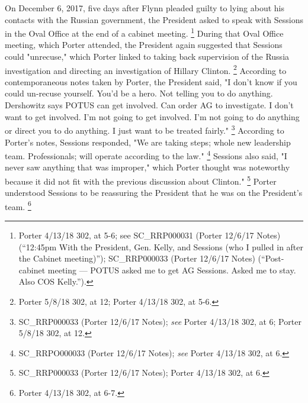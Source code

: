 {On December 6, 2017, five days after Flynn pleaded guilty to lying about his contacts with the Russian government, the President asked to speak with Sessions in the Oval Office at the end of a cabinet meeting.%
\footnote{Porter 4/13/18 302, at 5-6;
see SC\_RRP000031 (Porter 12/6/17 Notes) (“12:45pm With the President, Gen. Kelly, and Sessions (who I pulled in after the Cabinet meeting)”);
SC\_RRP000033 (Porter 12/6/17 Notes) (“Post-cabinet meeting — POTUS asked me to get AG Sessions.
Asked me to stay.
Also COS Kelly.”).}
During that Oval Office meeting, which Porter attended, the President again suggested that Sessions could "unrecuse," which Porter linked to taking back supervision of the Russia investigation and directing an investigation of Hillary Clinton.%
\footnote{Porter 5/8/18 302, at 12;
Porter 4/13/18 302, at 5-6.}
According to contemporaneous notes taken by Porter, the President said, "I don't know if you could un-recuse yourself.
You'd be a hero.
Not telling you to do anything.
Dershowitz says POTUS can get involved.
Can order AG to investigate.
I don't want to get involved.
I'm not going to get involved.
I'm not going to do anything or direct you to do anything.
I just want to be treated fairly."%
\footnote{SC\_RRP000033 (Porter 12/6/17 Notes);
\textit{see} Porter 4/13/18 302, at 6;
Porter 5/8/18 302, at 12.}
According to Porter's notes, Sessions responded, "We are taking steps; whole new leadership team.
Professionals; will operate according to the law."%
\footnote{SC\_RRPO000033 (Porter 12/6/17 Notes);
\textit{see} Porter 4/13/18 302, at 6.}
Sessions also said, "I never saw anything that was improper," which Porter thought was noteworthy because it did not fit with the previous discussion about Clinton."%
\footnote{SC\_RRP000033 (Porter 12/6/17 Notes);
Porter 4/13/18 302, at 6.}
Porter understood Sessions to be reassuring the President that he was on the President's team.%
\footnote{Porter 4/13/18 302, at 6-7.}

}
